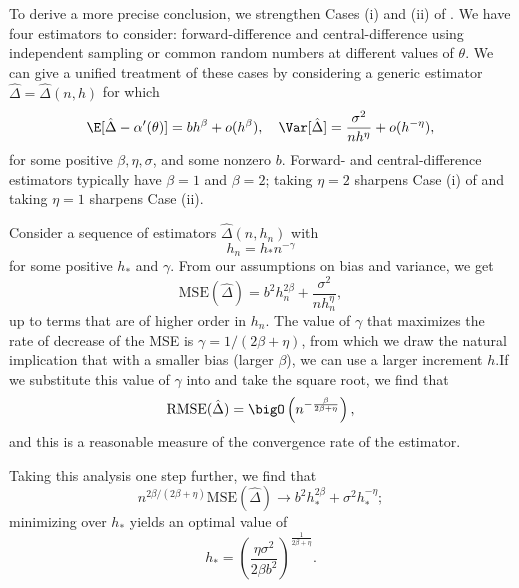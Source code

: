 To derive a more precise conclusion, we strengthen Cases (i) and (ii) of . We have four estimators to consider: forward-difference and central-difference using independent sampling or common random numbers at different values of \(\theta\). We can give a unified treatment of these cases by considering a generic estimator \(\hat{\Delta} = \hat{\Delta}(n, h)\) for which
\begin{equation}
	\label{eq:BiasVarianceTradeoff}
	\E[\hat{\Delta} - \alpha'(\theta)] = b h^\beta + o(h^\beta), \quad \Var[\hat{\Delta}] = \frac{\sigma^2}{n h^\eta} + o(h^{-\eta}),
\end{equation}
for some positive \(\beta, \eta, \sigma\), and some nonzero \(b\). Forward- and central-difference estimators typically have \(\beta = 1\) and \(\beta = 2\); taking \(\eta = 2\) sharpens Case (i) of  and taking \(\eta = 1\) sharpens Case (ii).

Consider a sequence of estimators \(\hat{\Delta}(n, h_n)\) with
\begin{equation}
	\label{eq:BandwidthSequence}
	h_n = h_* n^{-\gamma}
\end{equation}
for some positive \(h_*\) and \(\gamma\). From our assumptions on bias and variance, we get
\begin{equation}
	\label{eq:MSEExpansion}
	\mathrm{MSE}(\hat{\Delta}) = b^2 h_n^{2\beta} + \frac{\sigma^2}{n h_n^\eta},
\end{equation}
up to terms that are of higher order in \(h_n\). The value of \(\gamma\) that maximizes the rate of decrease of the MSE is \(\gamma = 1/(2\beta + \eta)\), from which we draw the natural implication that with a smaller bias (larger \(\beta\)), we can use a larger increment \(h\).If we substitute this value of \(\gamma\) into  and take the square
root, we find that
\begin{equation} \label{RmseConvergence}
	\mathrm{RMSE}(\hat{\Delta}) = \bigO \left( n^{-\frac{\beta}{2\beta+\eta}} \right) ,
\end{equation}
and this is a reasonable measure of the convergence rate of the estimator.

Taking this analysis one step further, we find that
\begin{equation} \label{MseLimit}
	n^{2\beta/(2\beta+\eta)}\mathrm{MSE}(\hat{\Delta}) \to b^2 h_*^{2\beta} + \sigma^2 h_*^{-\eta};
\end{equation}
minimizing over \(h_*\) yields an optimal value of
\begin{equation} \label{OptimalHStar}
	h_* = \left( \frac{\eta\sigma^2}{2\beta b^2} \right)^{\frac{1}{2\beta+\eta}} .
\end{equation}

